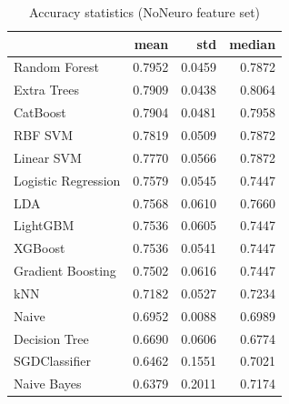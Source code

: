 \begin{table}
\caption{Accuracy statistics (NoNeuro feature set)}
\label{tab:accuracy_NoNeuro_stats}
\begin{tabular}{lrrr}
\toprule
 & mean & std & median \\
\midrule
Random Forest & 0.7952 & 0.0459 & 0.7872 \\
Extra Trees & 0.7909 & 0.0438 & 0.8064 \\
CatBoost & 0.7904 & 0.0481 & 0.7958 \\
RBF SVM & 0.7819 & 0.0509 & 0.7872 \\
Linear SVM & 0.7770 & 0.0566 & 0.7872 \\
Logistic Regression & 0.7579 & 0.0545 & 0.7447 \\
LDA & 0.7568 & 0.0610 & 0.7660 \\
LightGBM & 0.7536 & 0.0605 & 0.7447 \\
XGBoost & 0.7536 & 0.0541 & 0.7447 \\
Gradient Boosting & 0.7502 & 0.0616 & 0.7447 \\
kNN & 0.7182 & 0.0527 & 0.7234 \\
Naive & 0.6952 & 0.0088 & 0.6989 \\
Decision Tree & 0.6690 & 0.0606 & 0.6774 \\
SGDClassifier & 0.6462 & 0.1551 & 0.7021 \\
Naive Bayes & 0.6379 & 0.2011 & 0.7174 \\
\bottomrule
\end{tabular}
\end{table}
